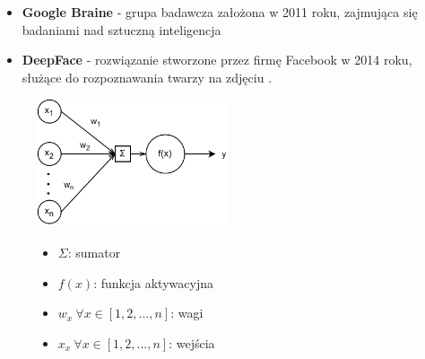 \begin{itemize}
    \item \textbf{Google Braine} - grupa badawcza założona w 2011 roku, zajmująca się badaniami nad sztuczną inteligencja
    \item \textbf{DeepFace} - rozwiązanie stworzone przez firmę Facebook w 2014 roku, służące do rozpoznawania twarzy na zdjęciu \cite{Koch2022, Fradkov2020}.
\end{itemize}

\begin{figure}[H]
    \centering
    \includegraphics[width=0.5\textwidth]{images/neuron}
    \begin{itemize}
        \item[] $\Sigma$: sumator
        \item[] $f(x)$: funkcja aktywacyjna
        \item[] $w_x \  \forall x \in [1, 2, ..., n]$: wagi
        \item[] $x_x \  \forall x \in [1, 2, ..., n]$: wejścia
    \end{itemize}
    \label{fig:neuron}
\end{figure}


